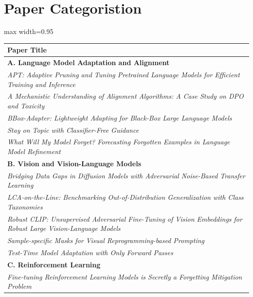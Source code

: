 \documentclass[11pt]{article}
\begin{document}
\clearpage

\section{Paper Categoristion}
\label{app:paper_category}
\vspace{2cm}
\begin{table}[h]
    \centering
    \begin{adjustbox}{max width=0.95\textwidth}
        \begin{tabular}{l}
            \toprule
            \textbf{Paper Title} \\
            \midrule
            \textbf{A. Language Model Adaptation and Alignment}\\
            \midrule
            \textit{APT: Adaptive Pruning and Tuning Pretrained Language Models for Efficient Training and Inference} \\
            \textit{A Mechanistic Understanding of Alignment Algorithms: A Case Study on DPO and Toxicity} \\
            \textit{BBox-Adapter: Lightweight Adapting for Black-Box Large Language Models} \\
            \textit{Stay on Topic with Classifier-Free Guidance} \\ 
            \textit{What Will My Model Forget? Forecasting Forgotten Examples in Language Model Refinement} \\
            \midrule
            \textbf{B. Vision and Vision-Language Models} \\
            \midrule
            \textit{Bridging Data Gaps in Diffusion Models with Adversarial Noise-Based Transfer Learning}\\
            \textit{LCA-on-the-Line: Benchmarking Out-of-Distribution Generalization with Class Taxonomies} \\
            \textit{Robust CLIP: Unsupervised Adversarial Fine-Tuning of Vision Embeddings for Robust Large Vision-Language Models} \\
            \textit{Sample-specific Masks for Visual Reprogramming-based Prompting} \\
            \textit{Test-Time Model Adaptation with Only Forward Passes} \\
            \midrule
            \textbf{C. Reinforcement Learning} \\
            \midrule
            \textit{Fine-tuning Reinforcement Learning Models is Secretly a Forgetting Mitigation Problem} \\

\end{tabular}
\end{adjustbox}
\end{table}
\end{document}
